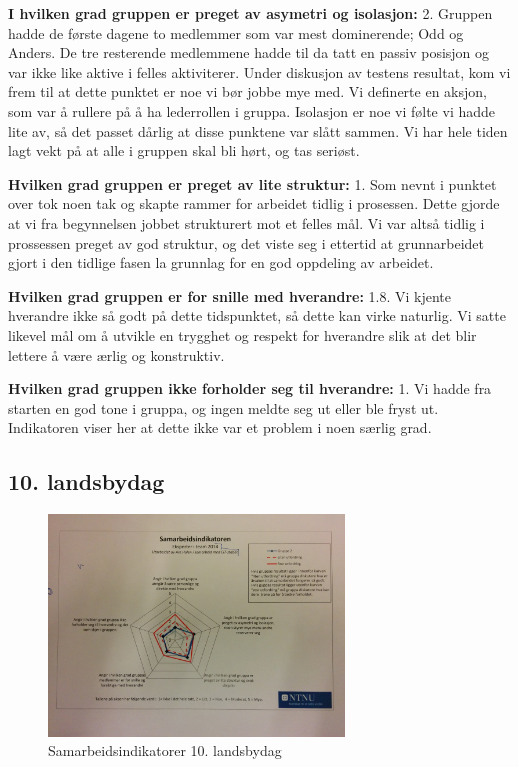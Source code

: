 \noindent \textbf{I hvilken grad gruppen er preget av asymetri og isolasjon:} 2.
\newline
\noindent Gruppen hadde de første dagene to medlemmer som var mest dominerende; Odd og Anders.
De tre resterende medlemmene hadde til da tatt en passiv posisjon og var ikke like aktive i felles aktiviterer. 
Under diskusjon av testens resultat, kom vi frem til at dette punktet er noe vi bør jobbe mye med. Vi definerte en aksjon, som var å rullere på å ha lederrollen i gruppa. 
Isolasjon er noe vi følte vi hadde lite av, så det passet dårlig at disse punktene var slått sammen. Vi har hele tiden lagt vekt på at alle i gruppen skal bli hørt, og tas seriøst. 

\vspace{\secspace}

\noindent \textbf{Hvilken grad gruppen er preget av lite struktur:} 1.
\newline
\noindent Som nevnt i punktet over tok noen tak og skapte rammer for arbeidet tidlig i prosessen. Dette gjorde at vi fra begynnelsen jobbet strukturert mot et felles mål. Vi var altså tidlig i prossessen preget av god struktur, og det viste seg i ettertid at grunnarbeidet gjort i den tidlige fasen la grunnlag for en god oppdeling av arbeidet. 
\vspace{\secspace}

\noindent \textbf{Hvilken grad gruppen er for snille med hverandre:} 1.8.
\newline
\noindent Vi kjente hverandre ikke så godt på dette tidspunktet, så dette kan virke naturlig. Vi satte likevel mål om å utvikle en trygghet og respekt for hverandre slik at det blir lettere å være ærlig og konstruktiv.
\vspace{\secspace}

\noindent \textbf{Hvilken grad gruppen ikke forholder seg til hverandre:} 1.
\newline
\noindent Vi hadde fra starten en god tone i gruppa, og ingen meldte seg ut eller ble fryst ut. Indikatoren viser her at dette ikke var et problem i noen særlig grad.

\subsection{10. landsbydag}
\begin{figure}[H]
    \centering
    \includegraphics[width=0.7\textwidth]{images/sam2.jpg} 
    \caption{Samarbeidsindikatorer 10. landsbydag}
    \label{fig:sam2}
\end{figure}

